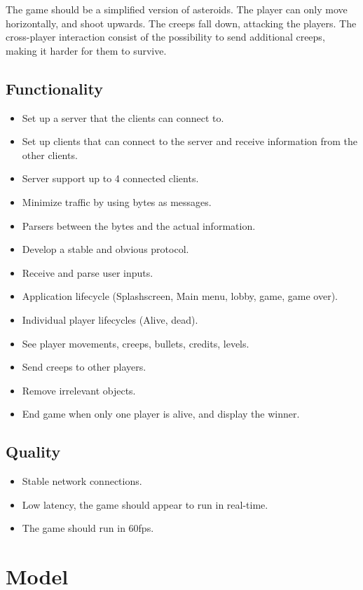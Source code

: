 \documentclass[a4paper]{article}
\begin{document}
The game should be a simplified version of asteroids. The player can only move horizontally, and shoot upwards.
The creeps fall down, attacking the players. The cross-player interaction consist of the possibility to send 
additional creeps, making it harder for them to survive.

\subsection{Functionality}
\begin{itemize}
  \item Set up a server that the clients can connect to.
  \item Set up clients that can connect to the server and receive information from the other clients.
  \item Server support up to 4 connected clients.
  \item Minimize traffic by using bytes as messages.
  \item Parsers between the bytes and the actual information.
  \item Develop a stable and obvious protocol.
  \item Receive and parse user inputs.
  \item Application lifecycle (Splashscreen, Main menu, lobby, game, game over).
  \item Individual player lifecycles (Alive, dead).
  \item See player movements, creeps, bullets, credits, levels.
  \item Send creeps to other players.
  \item Remove irrelevant objects.
  \item End game when only one player is alive, and display the winner.
\end{itemize}

\subsection{Quality}
\begin{itemize}
  \item Stable network connections.
  \item Low latency, the game should appear to run in real-time.
  \item The game should run in 60fps.
\end{itemize}
\section{Model}
\end{document}
